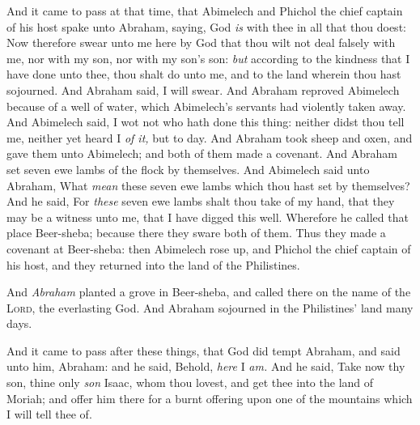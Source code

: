 \documentclass[11pt,letterpaper,oneside]{memoir}
\begin{document}
And it came to pass at that time, that Abimelech and Phichol the chief
captain of his host spake unto Abraham, saying, God \emph{is} with thee
in all that thou doest: Now therefore swear unto me here by God that
thou wilt not deal falsely with me, nor with my son, nor with my son's
son: \emph{but} according to the kindness that I have done unto thee,
thou shalt do unto me, and to the land wherein thou hast sojourned. And
Abraham said, I will swear. And Abraham reproved Abimelech because of a
well of water, which Abimelech's servants had violently taken away. And
Abimelech said, I wot not who hath done this thing: neither didst thou
tell me, neither yet heard I \emph{of it,} but to day. And Abraham took
sheep and oxen, and gave them unto Abimelech; and both of them made a
covenant. And Abraham set seven ewe lambs of the flock by themselves.
And Abimelech said unto Abraham, What \emph{mean} these seven ewe lambs
which thou hast set by themselves? And he said, For \emph{these} seven
ewe lambs shalt thou take of my hand, that they may be a witness unto
me, that I have digged this well. Wherefore he called that place
Beer-sheba; because there they sware both of them. Thus they made a
covenant at Beer-sheba: then Abimelech rose up, and Phichol the chief
captain of his host, and they returned into the land of the Philistines.

And \emph{Abraham} planted a grove in Beer-sheba, and called there on
the name of the \textsc{Lord}, the everlasting God. And Abraham sojourned
in the Philistines' land many days.

And it came to pass after these things, that God did tempt Abraham, and
said unto him, Abraham: and he said, Behold, \emph{here} I \emph{am. }And he
said, Take now thy son, thine only \emph{son} Isaac, whom thou lovest,
and get thee into the land of Moriah; and offer him there for a burnt
offering upon one of the mountains which I will tell thee of.
\end{document}
